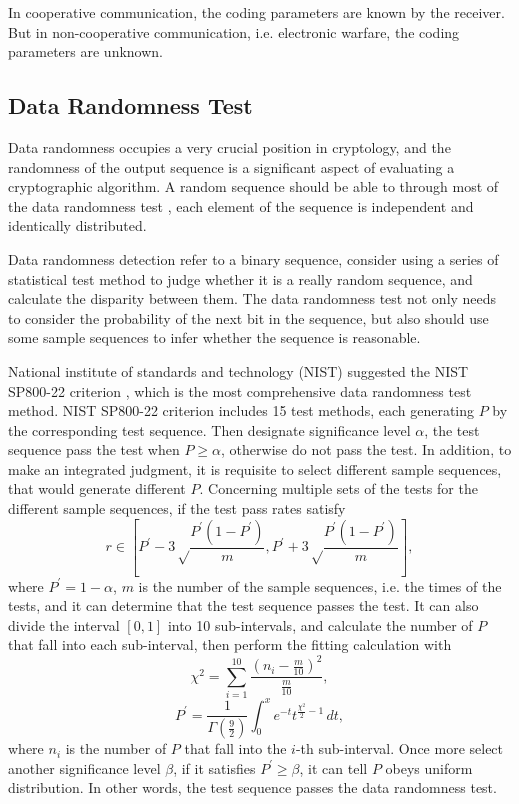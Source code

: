 \documentclass[conference]{IEEEtran}
\begin{document}
In cooperative communication, the coding parameters are known by the receiver. But in non-cooperative communication, i.e. electronic warfare, the coding parameters are unknown.


\subsection{Data Randomness Test}
Data randomness occupies a very crucial position in cryptology, and the randomness of the output sequence is a significant aspect of evaluating a cryptographic algorithm. A random sequence should be able to through most of the data randomness test \cite{qu2021test}, each element of the sequence is independent and identically distributed.

Data randomness detection refer to a binary sequence, consider using a series of statistical test method to judge whether it is a really random sequence, and calculate the disparity between them. The data randomness test not only needs to consider the probability of the next bit in the sequence, but also should use some sample sequences to infer whether the sequence is reasonable.

National institute of standards and technology (NIST) \cite{lee2021nist} suggested the NIST SP800-22 criterion \cite{iwasaki2019deriving}, which is the most comprehensive data randomness test method. NIST SP800-22 criterion includes 15 test methods, each generating $P$ by the corresponding test sequence. Then designate significance level $\alpha$, the test sequence pass the test when $P \geq \alpha$, otherwise do not pass the test. In addition, to make an integrated judgment, it is requisite to select different sample sequences, that would generate different $P$. Concerning multiple sets of the tests for the different sample sequences, if the test pass rates satisfy
\begin{equation}
	r \in  \left[P^{\prime} - 3\sqrt\frac{{P^{\prime}}(1 - P^{\prime})} m, P^{\prime} + 3\sqrt\frac{{P^{\prime}}(1 - P^{\prime})} m \right],
\end{equation}
where $P^{\prime} = 1 - \alpha$, $m$ is the number of the sample sequences, i.e. the times of the tests, and it can determine that the test sequence passes the test. It can also divide the interval $[0, 1]$ into 10 sub-intervals, and calculate the number of $P$ that fall into each sub-interval, then perform the fitting calculation with
\begin{equation}
	\chi^2 =  \sum_{i=1}^{10} \frac{(n_i - \frac{m}{10})^2} {\frac{m}{10}},
\end{equation}
\begin{equation}
	P^{\prime} =  \frac{1}{\Gamma(\frac {9} {2})} \int_{0}^{x} e^{-t} t^{\frac {\chi^2} {2} - 1}\, dt,
\end{equation}
where $n_i$ is the number of $P$ that fall into the $i$-th sub-interval. Once more select another significance level $\beta$, if it satisfies $P^{\prime} \geq \beta$, it can tell $P$ obeys uniform distribution. In other words, the test sequence passes the data randomness test.
\end{document}
